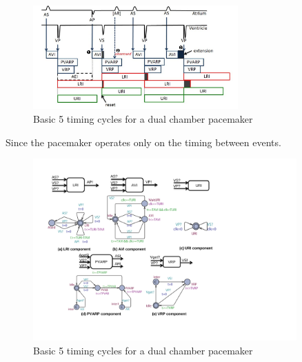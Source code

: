 \begin{figure}[!]
\center
\includegraphics[width=0.7\textwidth]{figs/PM_timers.pdf}
\caption{Basic 5 timing cycles for a dual chamber pacemaker}
\label{fig:PMtimers}

\end{figure} 
Since the pacemaker operates only on the timing between events. 
\begin{figure}[!t]
\center
\includegraphics[width=0.9\textwidth]{figs/pacemaker.pdf}
\caption{Basic 5 timing cycles for a dual chamber pacemaker}
\label{fig:PMdesign}
\end{figure} 
